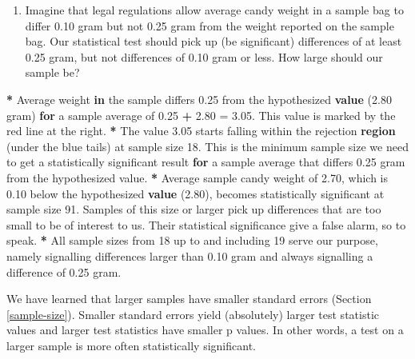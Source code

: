 \documentclass[a4paper]{book}
\newenvironment{Shaded}{\begin{snugshade}}{\end{snugshade}}
\newcommand{\KeywordTok}[1]{\textcolor[rgb]{0,0,0}{\textbf{#1}}}
\newcommand{\DecValTok}[1]{\textcolor[rgb]{0.00,0.00,0.00}{#1}}
\newcommand{\FloatTok}[1]{\textcolor[rgb]{0.00,0.00,0.00}{#1}}
\newcommand{\StringTok}[1]{\textcolor[rgb]{0.00,0.00,0.00}{#1}}
\newcommand{\ControlFlowTok}[1]{\textcolor[rgb]{0.00,0.00,0.00}{\textbf{#1}}}
\newcommand{\OperatorTok}[1]{\textcolor[rgb]{0.00,0.00,0.00}{\textbf{#1}}}
\newcommand{\NormalTok}[1]{#1}
\providecommand{\tightlist}{%
  \setlength{\itemsep}{0pt}\setlength{\parskip}{0pt}}
\theoremstyle{definition}
\theoremstyle{definition}
\theoremstyle{definition}
\theoremstyle{remark}
\begin{document}
\begin{enumerate}
\def\labelenumi{\arabic{enumi}.}
\setcounter{enumi}{1}
\tightlist
\item
  Imagine that legal regulations allow average candy weight in a sample
  bag to differ 0.10 gram but not 0.25 gram from the weight reported on
  the sample bag. Our statistical test should pick up (be significant)
  differences of at least 0.25 gram, but not differences of 0.10 gram or
  less. How large should our sample be?
\end{enumerate}

\begin{Shaded}
\begin{Highlighting}[]
\OperatorTok{*}\StringTok{ }\NormalTok{Average weight }\ControlFlowTok{in}\NormalTok{ the sample differs }\FloatTok{0.25}\NormalTok{ from the hypothesized }\KeywordTok{value}\NormalTok{ (}\FloatTok{2.80}
\NormalTok{gram) }\ControlFlowTok{for}\NormalTok{ a sample average of }\FloatTok{0.25} \OperatorTok{+}\StringTok{ }\FloatTok{2.80}\NormalTok{ =}\StringTok{ }\FloatTok{3.05}\NormalTok{. This value is marked by the}
\NormalTok{red line at the right.}
\OperatorTok{*}\StringTok{ }\NormalTok{The value }\FloatTok{3.05}\NormalTok{ starts falling within the rejection }\KeywordTok{region}\NormalTok{ (under the blue}
\NormalTok{tails) at sample size }\DecValTok{18}\NormalTok{. This is the minimum sample size we need to get a}
\NormalTok{statistically significant result }\ControlFlowTok{for}\NormalTok{ a sample average that differs }\FloatTok{0.25}\NormalTok{ gram}
\NormalTok{from the hypothesized value.}
\OperatorTok{*}\StringTok{ }\NormalTok{Average sample candy weight of }\FloatTok{2.70}\NormalTok{, which is }\FloatTok{0.10}\NormalTok{ below the hypothesized}
\KeywordTok{value}\NormalTok{ (}\FloatTok{2.80}\NormalTok{), becomes statistically significant at sample size }\DecValTok{91}\NormalTok{. Samples of}
\NormalTok{this size or larger pick up differences that are too small to be of interest to}
\NormalTok{us. Their statistical significance give a false alarm, so to speak.}
\OperatorTok{*}\StringTok{ }\NormalTok{All sample sizes from }\DecValTok{18}\NormalTok{ up to and including }\DecValTok{19}\NormalTok{ serve our purpose, namely}
\NormalTok{signalling differences larger than }\FloatTok{0.10}\NormalTok{ gram and always signalling a difference}
\NormalTok{of }\FloatTok{0.25}\NormalTok{ gram.}
\end{Highlighting}
\end{Shaded}

We have learned that larger samples have smaller standard errors
(Section \ref{sample-size}). Smaller standard errors yield (absolutely)
larger test statistic values and larger test statistics have smaller p
values. In other words, a test on a larger sample is more often
statistically significant.
\end{document}
